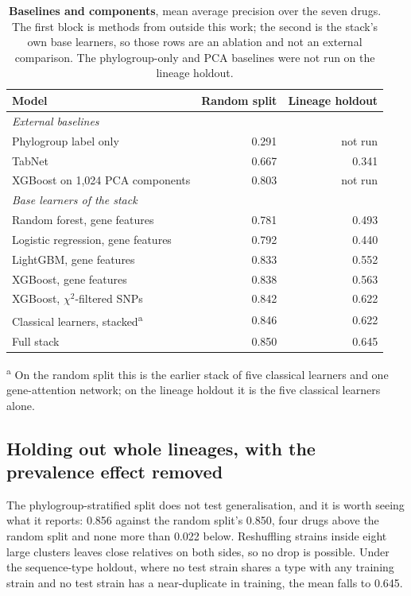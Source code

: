 \begin{table}[t]\centering\small
\caption{\textbf{Baselines and components}, mean average precision over the seven drugs. The first
block is methods from outside this work; the second is the stack's own base learners, so those rows
are an ablation and not an external comparison. The phylogroup-only and PCA baselines were not
run on the lineage holdout.}
\label{tab:baselines}
\begin{tabular}{lrr}
\toprule
Model & Random split & Lineage holdout \\
\midrule
\multicolumn{3}{l}{\textit{External baselines}} \\
Phylogroup label only & 0.291 & not run \\
TabNet & 0.667 & 0.341 \\
XGBoost on 1,024 PCA components & 0.803 & not run \\
\midrule
\multicolumn{3}{l}{\textit{Base learners of the stack}} \\
Random forest, gene features & 0.781 & 0.493 \\
Logistic regression, gene features & 0.792 & 0.440 \\
LightGBM, gene features & 0.833 & 0.552 \\
XGBoost, gene features & 0.838 & 0.563 \\
XGBoost, $\chi^2$-filtered SNPs & 0.842 & 0.622 \\
Classical learners, stacked\textsuperscript{a} & 0.846 & 0.622 \\
\midrule
Full stack & 0.850 & 0.645 \\
\bottomrule
\end{tabular}

\smallskip\footnotesize\textsuperscript{a} On the random split this is the earlier stack of five
classical learners and one gene-attention network; on the lineage holdout it is the five classical
learners alone.
\end{table}

\subsection*{Holding out whole lineages, with the prevalence effect removed}

The phylogroup-stratified split does not test generalisation, and it is worth seeing what it
reports: 0.856 against the random split's 0.850, four drugs above the random split and none more
than 0.022 below. Reshuffling strains inside eight large clusters leaves close relatives on both
sides, so no drop is possible. Under the sequence-type holdout, where no test strain shares a type
with any training strain and no test strain has a near-duplicate in training, the mean falls to
0.645.

